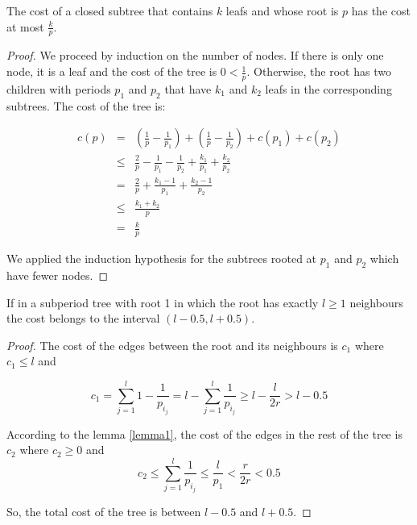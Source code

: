 \begin{lemma}\label{lemma1}
The cost of a closed subtree that contains $k$ leafs and whose root is $p$ has the cost at most $\frac{k}{p}$.
\end{lemma}

\begin{proof}
We proceed by induction on the number of nodes. If there is only one node, it is a leaf and the cost of the tree is $0<\frac 1p$. Otherwise, the root has two children with periods $p_1$ and $p_2$ that have $k_1$ and $k_2$ leafs in the corresponding subtrees. The cost of the tree is: 

\begin{eqnarray*}
c(p) &=& \left(\frac 1p - \frac 1 {p_1}\right) + \left(\frac 1 p - \frac 1 {p_2}\right)+c(p_1)+c(p_2) \\
    &\leq & \frac 2p-\frac 1 {p_1}-\frac 1 {p_2} + \frac {k_1}{p_1}+\frac {k_2}{p_2} \\
    &=&\frac 2p + \frac{k_1-1}{p_1}+\frac{k_2-1}{p_2} \\
    &\leq & \frac{k_1+k_2}p \\
    &=&\frac kp
\end{eqnarray*}

We applied the induction hypothesis for the subtrees rooted at $p_1$ and $p_2$ which have fewer nodes. 
\end{proof}

\begin{lemma}\label{lemma2}
If in a subperiod tree with root 1 in which the root has exactly $l \ge 1$ neighbours the cost belongs to the interval $(l-0.5,l+0.5)$.
\end{lemma}
\begin{proof}
The cost of the edges between the root and its neighbours is $c_1$ where $c_1 \le l$ and 

$$c_1 = \sum_{j=1}^{l} 1-\frac 1 {p_{i_j}}  = l - \sum_{j=1}^l \frac 1 {p_{i_j}} \geq l-\frac l {2r} >l-0.5$$

According to the lemma \ref{lemma1}, the cost of the edges in the rest of the tree is $c_2$ where $c_2 \ge 0$ and 
$$c_2 \le \sum_{j=1}^l \frac 1 {p_{i_j}} \leq \frac l {p_1} < \frac r {2r} < 0.5$$

So, the total cost of the tree is between $l-0.5$ and $l+0.5$.
\end{proof}

